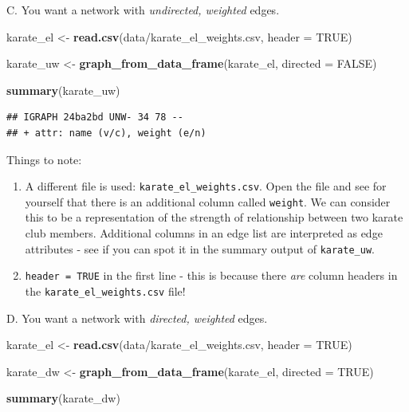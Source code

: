 \documentclass[
]{book}
\newenvironment{Shaded}{\begin{snugshade}}{\end{snugshade}}
\newcommand{\AttributeTok}[1]{\textcolor[rgb]{0.13,0.29,0.53}{#1}}
\newcommand{\ConstantTok}[1]{\textcolor[rgb]{0.56,0.35,0.01}{#1}}
\newcommand{\FunctionTok}[1]{\textcolor[rgb]{0.13,0.29,0.53}{\textbf{#1}}}
\newcommand{\NormalTok}[1]{#1}
\newcommand{\OtherTok}[1]{\textcolor[rgb]{0.56,0.35,0.01}{#1}}
\newcommand{\StringTok}[1]{\textcolor[rgb]{0.31,0.60,0.02}{#1}}
\providecommand{\tightlist}{%
  \setlength{\itemsep}{0pt}\setlength{\parskip}{0pt}}
\begin{document}
C. You want a network with \emph{undirected, weighted} edges.

\begin{Shaded}
\begin{Highlighting}[]
\NormalTok{karate\_el }\OtherTok{\textless{}{-}} \FunctionTok{read.csv}\NormalTok{(}\StringTok{\textquotesingle{}data/karate\_el\_weights.csv\textquotesingle{}}\NormalTok{, }\AttributeTok{header =} \ConstantTok{TRUE}\NormalTok{)}

\NormalTok{karate\_uw }\OtherTok{\textless{}{-}} \FunctionTok{graph\_from\_data\_frame}\NormalTok{(karate\_el, }\AttributeTok{directed =} \ConstantTok{FALSE}\NormalTok{)}

\FunctionTok{summary}\NormalTok{(karate\_uw)}
\end{Highlighting}
\end{Shaded}

\begin{verbatim}
## IGRAPH 24ba2bd UNW- 34 78 -- 
## + attr: name (v/c), weight (e/n)
\end{verbatim}

Things to note:

\begin{enumerate}
\def\labelenumi{\arabic{enumi}.}
\tightlist
\item
  A different file is used: \texttt{karate\_el\_weights.csv}. Open the file and see for yourself that there is an additional column called \texttt{weight}. We can consider this to be a representation of the strength of relationship between two karate club members. Additional columns in an edge list are interpreted as edge attributes - see if you can spot it in the summary output of \texttt{karate\_uw}.
\item
  \texttt{header\ =\ TRUE} in the first line - this is because there \emph{are} column headers in the \texttt{karate\_el\_weights.csv} file!
\end{enumerate}

D. You want a network with \emph{directed, weighted} edges.

\begin{Shaded}
\begin{Highlighting}[]
\NormalTok{karate\_el }\OtherTok{\textless{}{-}} \FunctionTok{read.csv}\NormalTok{(}\StringTok{\textquotesingle{}data/karate\_el\_weights.csv\textquotesingle{}}\NormalTok{, }\AttributeTok{header =} \ConstantTok{TRUE}\NormalTok{)}

\NormalTok{karate\_dw }\OtherTok{\textless{}{-}} \FunctionTok{graph\_from\_data\_frame}\NormalTok{(karate\_el, }\AttributeTok{directed =} \ConstantTok{TRUE}\NormalTok{)}

\FunctionTok{summary}\NormalTok{(karate\_dw)}
\end{Highlighting}
\end{Shaded}
\end{document}
